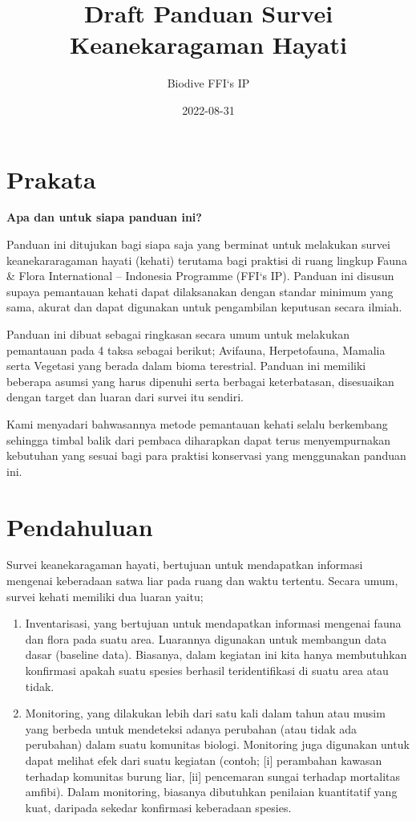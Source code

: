 \documentclass[
]{book}
\title{Draft Panduan Survei Keanekaragaman Hayati}
\author{Biodive FFI`s IP}
\date{2022-08-31}
\begin{document}
\maketitle

{
\setcounter{tocdepth}{1}
\tableofcontents
}
\hypertarget{prakata}{%
\chapter*{Prakata}\label{prakata}}

\textbf{Apa dan untuk siapa panduan ini?}

Panduan ini ditujukan bagi siapa saja yang berminat untuk melakukan survei keanekararagaman hayati (kehati) terutama bagi praktisi di ruang lingkup Fauna \& Flora International -- Indonesia Programme (FFI`s IP). Panduan ini disusun supaya pemantauan kehati dapat dilaksanakan dengan standar minimum yang sama, akurat dan dapat digunakan untuk pengambilan keputusan secara ilmiah.

Panduan ini dibuat sebagai ringkasan secara umum untuk melakukan pemantauan pada 4 taksa sebagai berikut; Avifauna, Herpetofauna, Mamalia serta Vegetasi yang berada dalam bioma terestrial. Panduan ini memiliki beberapa asumsi yang harus dipenuhi serta berbagai keterbatasan, disesuaikan dengan target dan luaran dari survei itu sendiri.

Kami menyadari bahwasannya metode pemantauan kehati selalu berkembang sehingga timbal balik dari pembaca diharapkan dapat terus menyempurnakan kebutuhan yang sesuai bagi para praktisi konservasi yang menggunakan panduan ini.

\hypertarget{pendahuluan}{%
\chapter*{Pendahuluan}\label{pendahuluan}}

Survei keanekaragaman hayati, bertujuan untuk mendapatkan informasi mengenai keberadaan satwa liar pada ruang dan waktu tertentu. Secara umum, survei kehati memiliki dua luaran yaitu;

\begin{enumerate}
\def\labelenumi{(\arabic{enumi})}
\item
  Inventarisasi, yang bertujuan untuk mendapatkan informasi mengenai fauna dan flora pada suatu area. Luarannya digunakan untuk membangun data dasar (baseline data). Biasanya, dalam kegiatan ini kita hanya membutuhkan konfirmasi apakah suatu spesies berhasil teridentifikasi di suatu area atau tidak.
\item
  Monitoring, yang dilakukan lebih dari satu kali dalam tahun atau musim yang berbeda untuk mendeteksi adanya perubahan (atau tidak ada perubahan) dalam suatu komunitas biologi. Monitoring juga digunakan untuk dapat melihat efek dari suatu kegiatan (contoh; {[}i{]} perambahan kawasan terhadap komunitas burung liar, {[}ii{]} pencemaran sungai terhadap mortalitas amfibi). Dalam monitoring, biasanya dibutuhkan penilaian kuantitatif yang kuat, daripada sekedar konfirmasi keberadaan spesies.
\end{enumerate}
\end{document}
